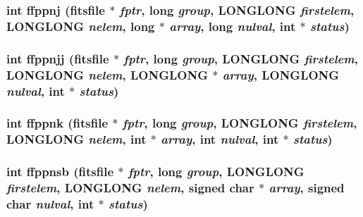 \subsubsection{\setlength{\rightskip}{0pt plus 5cm}int ffppnj (\bf{fitsfile} $\ast$ {\em fptr}, long {\em group}, \bf{LONGLONG} {\em firstelem}, \bf{LONGLONG} {\em nelem}, long $\ast$ {\em array}, long {\em nulval}, int $\ast$ {\em status})}\label{test_2shm__client_2fitsio_8h_4a7b775c21b67c8744fbd23f9a3c1789}


\subsubsection{\setlength{\rightskip}{0pt plus 5cm}int ffppnjj (\bf{fitsfile} $\ast$ {\em fptr}, long {\em group}, \bf{LONGLONG} {\em firstelem}, \bf{LONGLONG} {\em nelem}, \bf{LONGLONG} $\ast$ {\em array}, \bf{LONGLONG} {\em nulval}, int $\ast$ {\em status})}\label{test_2shm__client_2fitsio_8h_76ad1e16557d84ed3f528848a243db06}


\subsubsection{\setlength{\rightskip}{0pt plus 5cm}int ffppnk (\bf{fitsfile} $\ast$ {\em fptr}, long {\em group}, \bf{LONGLONG} {\em firstelem}, \bf{LONGLONG} {\em nelem}, int $\ast$ {\em array}, int {\em nulval}, int $\ast$ {\em status})}\label{test_2shm__client_2fitsio_8h_eb3b195b63cb8a9b04d47cf6b8fda66a}


\subsubsection{\setlength{\rightskip}{0pt plus 5cm}int ffppnsb (\bf{fitsfile} $\ast$ {\em fptr}, long {\em group}, \bf{LONGLONG} {\em firstelem}, \bf{LONGLONG} {\em nelem}, signed char $\ast$ {\em array}, signed char {\em nulval}, int $\ast$ {\em status})}\label{test_2shm__client_2fitsio_8h_d663bf4dbce34e909c2eb15c2da1a376}


